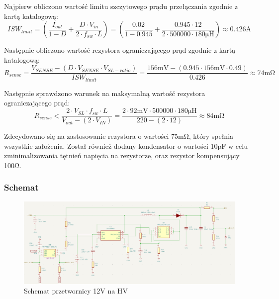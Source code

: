 \documentclass[../../main.tex]{subfiles}
\begin{document}
Najpierw obliczono wartość limitu szczytowego prądu przełączania zgodnie z kartą katalogową:
\begin{equation}
    ISW_{limit} = \left(\frac{I_{out}}{1-D}+\frac{D \cdot V_{in}}{2 \cdot f_{sw} \cdot L}\right) = \left(\frac{0.02}{1-0.945}+\frac{0.945 \cdot 12}{2 \cdot 500000 \cdot 180\si{\micro\henry}}\right) \approx 0.426\si{\ampere}
\end{equation}

Następnie obliczono wartość rezystora ograniczającego prąd zgodnie z kartą katalogową:
\begin{equation}
    R_{sense} = \frac{V_{SENSE} - (D \cdot V_{SENSE} \cdot V_{SL-ratio})}{ISW_{limit}} = \frac{156\si{\milli\volt} - (0.945 \cdot 156\si{\milli\volt} \cdot 0.49)}{0.426} \approx 74\si{\milli\ohm}
\end{equation}

Następnie sprawdzono warunek na maksymalną wartość rezystora ograniczającego prąd:
\begin{equation}
    R_{sense} < \frac{2 \cdot V_{SL} \cdot f_{sw} \cdot L}{V_{out} - (2 \cdot V_{IN})} = \frac{2 \cdot 92\si{\milli\volt} \cdot 500000 \cdot 180\si{\micro\henry}}{220 - (2 \cdot 12)} \approx 84\si{\milli\ohm}
\end{equation}

Zdecydowano się na zastosowanie rezystora o wartości 75\si{\milli\ohm}, który spełnia wszystkie założenia.
Został również dodany kondensator o wartości 10\si{\pico\farad} w celu zminimalizowania tętnień napięcia na rezystorze,
oraz rezystor kompensujący 100\si{\ohm}.
\subsubsection{Schemat}
\begin{figure}[H]
    \centering
    \includegraphics[width=1\textwidth]{schemat.png}
    \caption{Schemat przetwornicy 12V na HV}
\end{figure}
\end{document}
